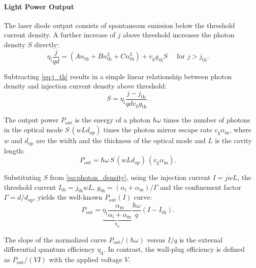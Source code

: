 \paragraph{Light Power Output}

The laser diode output consists of spontaneous emission below the threshold
current density. A further increase of $j$ above threshold increases the photon density
$S$ directly:
\begin{equation}
	\eta_{\mathrm{i}}\frac{j}{qd}= (An_{\mathrm{th}}+Bn^{2}_{\mathrm{th}}+C n^{3}_{\mathrm{th}}
	) +v_{\mathrm{g}}g_{\mathrm{th}}S \quad \text{ for }j>j_{\mathrm{th}}.
\end{equation}

Subtracting \cref{eq:j_th} results in a simple linear
relationship between photon density and injection current density above
threshold:
\begin{equation}
	S=\eta_{\mathrm{i}}\frac{j-j_{\mathrm{th}}}{qd v_{\mathrm{g}}g_{\mathrm{th}}}.
	\label{eq:photon_density}
\end{equation}

The output power $P_{\mathrm{out}}$ is the energy of a photon $\hbar\omega$ times the
number of photons in the optical mode $S\,(wLd_{\mathrm{op}})$ times the photon mirror
escape rate $v_{\mathrm{g}}\alpha_{\mathrm{m}}$, where $w$ and $d_{\mathrm{op}}$ are the
width and the thickness of the optical mode and $L$ is the cavity length:
\begin{equation}
	P_{\mathrm{out}}=\hbar\omega\, S\,(wLd_{\mathrm{op}})\,(v_{\mathrm{g}}\alpha_{\mathrm{m}}
	).
\end{equation}

Substituting $S$ from \cref{eq:photon_density}, using the injection current $I=jw
L$, the threshold current $I_{\mathrm{th}}=j_{\mathrm{th}}wL$, $g_{\mathrm{th}}=(\alpha_{\mathrm{i}}+\alpha
_{\mathrm{m}})/\Gamma$ and the confinement factor $\Gamma=d/d_{\mathrm{op}}$, yields
the well-known $P_{\mathrm{out}}(I)$ curve:
\begin{equation}
	P_{\mathrm{out}}=\underbrace{ \eta_{\mathrm{i}} \frac{\alpha_{\mathrm{m}}}{\alpha_{\mathrm{i}}+\alpha_{\mathrm{m}}}
	}_{ \eta_{\mathrm{d}} }\frac{\hbar \omega}{q}(I-I_{\mathrm{th}}).
	\label{eq:p_i_function}
\end{equation}

The slope of the normalized curve $P_{\mathrm{out}}/(\hbar \omega)$ versus $I /q$
is the external differential quantum efficiency $\eta_{\mathrm{d}}$. In contrast,
the wall-plug efficiency is defined as $P_{\mathrm{out}}/ (VI)$ with the applied voltage
$V$.

